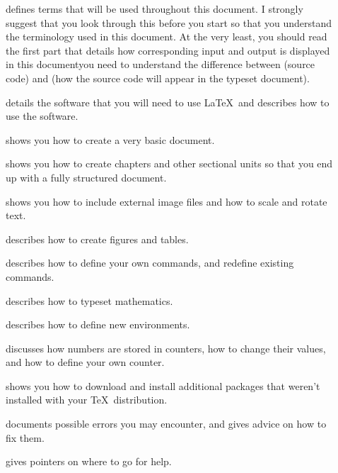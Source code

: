 \begin{description}

\item[]
defines terms that will be used throughout this document.  I
strongly suggest that you look through this
 before you start so that you understand
the terminology used in this document. At the very least, you should
read the first part that details how corresponding input and output
is displayed in this document\dash you need to understand the
difference between  (source code) and  (how the
source code will appear in the typeset document).

\item[] details the software that you will
need to use \LaTeX\ and describes how to use the software.

\item[] shows you how to create a very
basic document.  

\item[] 
shows you how to create chapters and other sectional units so that
you end up with a fully structured document.

\item[]
shows you how to include external image files and how to scale and
rotate text.

\item[]
describes how to create figures and tables.

\item[]
describes how to define your own commands, and redefine existing
commands.

\item[] describes how
to typeset mathematics.  

\item[] describes how to define new
environments.  

\item[]
discusses how numbers are stored in counters, how to change their
values, and how to define your own counter.

\item[] shows you how
to download and install additional
packages that weren't installed with your \TeX\ distribution.

\item[]
documents possible errors you may encounter, and gives advice on how
to fix them.

\item[] gives pointers on where to go for help.

\end{description}

